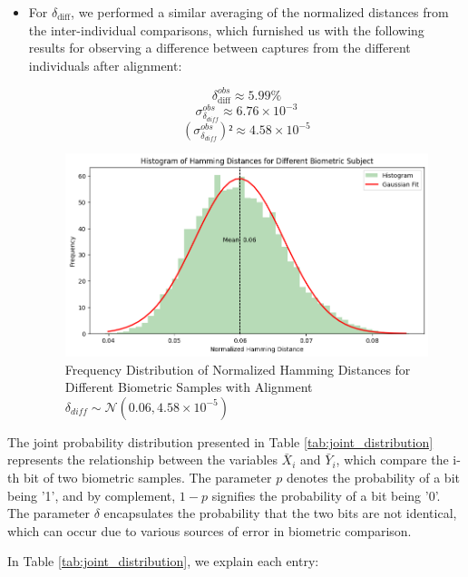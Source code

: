 \begin{enumerate}
\begin{itemize}
        \newpage
        \item For \( \delta_{\text{diff}} \), we performed a similar averaging of the normalized distances from the inter-individual comparisons, which furnished us with the following results for observing a difference between captures from the different individuals after alignment:

        \[ \delta_{\text{diff}}^{obs} \approx 5.99\% \]
        \[ \sigma^{obs}_{\delta_{diff}} \approx 6.76 \times 10^{-3} \]
        \[ (\sigma^{obs}_{\delta_{diff}})² \approx 4.58 \times 10^{-5} \]

        \begin{figure}[H]
            \centering
            \includegraphics[width=0.7\linewidth]{latex-img/delta_diff.png}
            \caption{Frequency Distribution of Normalized Hamming Distances for Different Biometric Samples with Alignment \(\delta_{diff} \sim \mathcal{N}(0.06, 4.58 \times 10^{-5})\)}
            \label{delta_diff}
        \end{figure}
    \end{itemize}
\end{enumerate}

The joint probability distribution presented in Table \ref{tab:joint_distribution} represents the relationship between the variables \(\bar{X}_i\) and \(\bar{Y}_i\), which compare the i-th bit of two biometric samples. The parameter \(p\) denotes the probability of a bit being '1', and by complement, \(1-p\) signifies the probability of a bit being '0'. The parameter \(\delta\) encapsulates the probability that the two bits are not identical, which can occur due to various sources of error in biometric comparison. 

In Table \ref{tab:joint_distribution}, we explain each entry:

